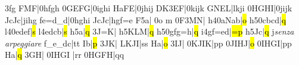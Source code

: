   \fi
  \dsoqb3fg\enotes
\barre\notes\zq F\ql M\sk{}F|\qsoqb0hfgh\enotes
\temps\notes\qsoqb0GEFG|\qsoqb0ighi\enotes
\alaligne\noteskipLARGE\notes\zq H\ql a\sk{}FE|\qsoqb0jhij\enotes
\temps\notes\zq D\ql K\sk\dsoqb3EF|\qsoqb0kijk\enotes
\barre\notes\zq G\ql N\sk\zq E\ql L|lkji\enotes
\temps\notes\qsoqb0HGHI|\qsoqb0jijk\enotes
\barre\notes\zq J\ql c\sk\zq J\ql c|jihg\enotes
\temps\notes{}fe{=d}{_d}|\qsoqb0hghi\enotes
\alaligne\notes\zq J\ql c\sk\zq J\ql c|hgf{=e}\enotes
\temps\arpg F5\notes{}\ql a\sk|\relax
  \ifx\mxversion\undefined{}\relax
  \else\tslur0o\relax
  \fi
  \ql m\enotes
\temps\notes\Ilegl0F\dqb3MN|\soupir\enotes
\barre\nspace\uarpg h4\notes{}\qqb0aNab|\hl o\enotes
\temps\uArpg h5\notes\qqb0cbcd|\hl q\enotes
\barre\nspace\uarpg l4\notes\qqb0edef|\hl s\enotes
\temps\uarpg l4\notes{}edcb|\hl s\enotes
\barre\nspace\uarpg h5\notes{}\ql a\sk|\hl q\enotes
\advancebottom{-\Interligne}\relax      \def\interfacteur{10}%
\zalapage\noteskipLarge\notes\dsoqb3J{=K}|\enotes
\temps\uarpg h5\notes{}KLM|\hl q\enotes
\barre\noteskipLarge\nspace\uArpg h5\notes\qboqb0gfg{=h}|\hl q\enotes
\temps\uArpg i4\notes{}gf{=e}d|\hl{=p}\enotes
\barre\nspace\uArpg h5\notes\zq J\ql c\sk{}|\hl q\enotes
\temps\notes\zcharnote j{\noteskip\it senza arpeggiare}\relax
{}f{_e}{_d}c|\ql t\sk{}\ql t\enotes
\barre\notes{}\zq I\ql b\sk|\hl p\enotes
\temps\notes\dsoqb3JK|\enotes
\temps\notes\Soufflcr{}LKJI|\ql s\sk{}\ql s\enotes
\alaligne\notes\zq H\ql a\sk|\hl o\enotes
\temps\notes\dsoqb3IJ|\enotes
\temps\notes\qsoqb0KJIK|\ql p\sk{}\ql p\enotes
\barre\notes\qsoqb0JIHJ|\hl o\enotes
\temps\notes\qsoqb0IHGI|\ql p\sk{}\ql p\sk\enotes
\barre\notes\soufflcr\zq H\ql a|\hl q\enotes
\temps\notes\dsoqb3GH|\enotes
\temps\notes{}\qsoqb0IHGI\relax
    |\ql r\sk{}\ql r\sk\enotes
\barre\notes\qsoqb0HGFH|\ql q\sk{}\ql q\sk\enotes

